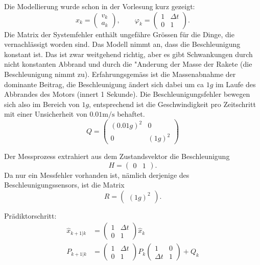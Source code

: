 \begin{loesung}
\begin{teilaufgaben}
\item Die Modellierung wurde schon in der Vorlesung kurz gezeigt:
\[
x_k=\begin{pmatrix}v_k\\a_k\end{pmatrix},\qquad
\varphi_k=\begin{pmatrix}1&\Delta t\\0&1\end{pmatrix}.
\]
Die Matrix der Systemfehler enthält ungefähre Grössen für die Dinge,
die vernachlässigt worden sind. Das Modell nimmt an, dass die
Beschleunigung konstant ist.
Das ist zwar weitgehend richtig, aber es gibt Schwankungen durch
nicht konstanten Abbrand und durch die "Anderung der Masse der
Rakete (die Beschleunigung nimmt zu). Erfahrungsgemäss ist die
Massenabnahme der dominante Beitrag, die Beschleunigung ändert sich
dabei um ca $1g$ im Laufe des Abbrandes des Motors (innert 1 Sekunde).
Die Beschleunigungsfehler bewegen sich also im Bereich von $1g$, entsprechend
ist die Geschwindigkeit pro Zeitschritt mit einer Unsicherheit von
$0.01\text{m/s}$ behaftet.
\[
Q=\begin{pmatrix}
(0.01g)^2&0\\
0&(1g)^2
\end{pmatrix}
\]
\item
Der Messprozess extrahiert aus dem Zustandsvektor die Beschleunigung
\[
H=\begin{pmatrix}0&1\end{pmatrix}.
\]
Da nur ein Messfehler vorhanden ist, nämlich derjenige des
Beschleunigungssensors, ist die Matrix
\[
R=\begin{pmatrix}
(1g)^2
\end{pmatrix}.
\]
\item Prädiktorschritt:
\begin{align*}
\hat x_{k+1|k}&=
\begin{pmatrix}1&\Delta t\\0&1\end{pmatrix}
\hat x_{k}
\\
P_{k+1|k}&=
\begin{pmatrix}1&\Delta t\\0&1\end{pmatrix}P_k
\begin{pmatrix}1&0\\\Delta t&1\end{pmatrix}
+
Q_k
\end{align*}

\end{teilaufgaben}
\end{loesung}

